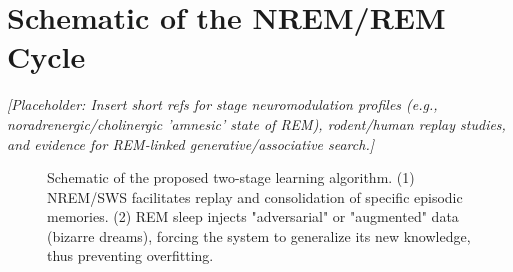 \section{Schematic of the NREM/REM Cycle}\label{sec:nrem_rem_schematic}

\textit{[Placeholder: Insert short refs for stage neuromodulation profiles (e.g., noradrenergic/cholinergic 'amnesic' state of REM), rodent/human replay studies, and evidence for REM-linked generative/associative search.]}

\begin{figure}[htbp]
  \centering
  \caption{Schematic of the proposed two-stage learning algorithm. (1) NREM/SWS facilitates replay and consolidation of specific episodic memories. (2) REM sleep injects "adversarial" or "augmented" data (bizarre dreams), forcing the system to generalize its new knowledge, thus preventing overfitting.}
  \label{fig:schematic}
\end{figure}
